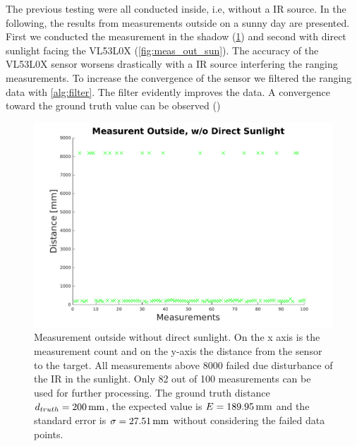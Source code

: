 The previous testing were all conducted inside, i.e, without a IR source. In the following, the results from measurements outside on a sunny day are presented. First we conducted the measurement in the shadow (\cref{fig:meas_out_shadow}) and second with direct sunlight facing the VL53L0X (\cref{fig:meas_out_sun}). The accuracy of the VL53L0X sensor worsens drastically with a IR source interfering the ranging measurements. To increase the convergence of the sensor we filtered the ranging data with \cref{alg:filter}. The filter evidently improves the data. A convergence toward the ground truth value can be observed ()
\begin{figure}
	\centering
	\includegraphics[width=0.9\linewidth]{pictures/plot_out_shadow.pdf}
	\caption{Measurement outside without direct sunlight. On the x axis is the measurement count and on the y-axis the distance from the sensor to the target. All measurements above 8000 failed due disturbance of the IR in the sunlight. Only 82 out of 100 measurements can be used for further processing. The ground truth distance $d_{truth}=\unit[200]{mm}$, the expected value is $E=\unit[189.95]{mm}$ and the standard error is $\sigma=\unit[27.51]{mm}$ without considering the failed data points.}
	\label{fig:meas_out_shadow}
\end{figure}

